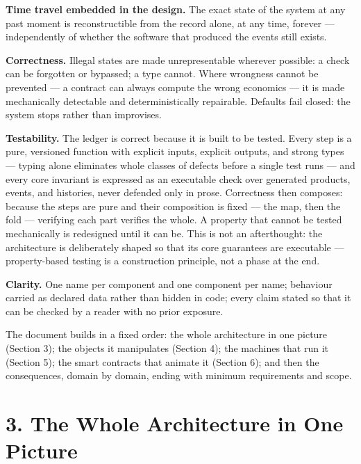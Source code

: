 \documentclass[11pt,a4paper]{article}
\begin{document}
\textbf{Time travel embedded in the design.} The exact state of the
system at any past moment is reconstructible from the record alone, at
any time, forever --- independently of whether the software that
produced the events still exists.

\textbf{Correctness.} Illegal states are made unrepresentable wherever
possible: a check can be forgotten or bypassed; a type cannot. Where
wrongness cannot be prevented --- a contract can always compute the
wrong economics --- it is made mechanically detectable and
deterministically repairable. Defaults fail closed: the system stops
rather than improvises.

\textbf{Testability.} The ledger is correct because it is built to be
tested. Every step is a pure, versioned function with explicit inputs,
explicit outputs, and strong types --- typing alone eliminates whole
classes of defects before a single test runs --- and every core
invariant is expressed as an executable check over generated products,
events, and histories, never defended only in prose. Correctness then
composes: because the steps are pure and their composition is fixed ---
the map, then the fold --- verifying each part verifies the whole. A
property that cannot be tested mechanically is redesigned until it can
be. This is not an afterthought: the architecture is deliberately shaped
so that its core guarantees are executable --- property-based testing is
a construction principle, not a phase at the end.

\textbf{Clarity.} One name per component and one component per name;
behaviour carried as declared data rather than hidden in code; every
claim stated so that it can be checked by a reader with no prior
exposure.

The document builds in a fixed order: the whole architecture in one
picture (Section 3); the objects it manipulates (Section 4); the
machines that run it (Section 5); the smart contracts that animate it
(Section 6); and then the consequences, domain by domain, ending with
minimum requirements and scope.

\hypertarget{the-whole-architecture-in-one-picture}{%
\section{3. The Whole Architecture in One
Picture}\label{the-whole-architecture-in-one-picture}}
\end{document}
